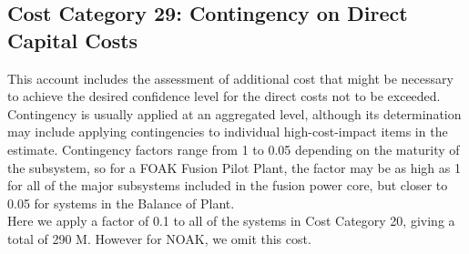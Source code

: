 \subsection{Cost Category 29: Contingency on Direct Capital Costs}

This account includes the assessment of additional cost that might be necessary to achieve the desired confidence level for the direct costs not to be exceeded. Contingency is usually applied at an aggregated level, although its determination may include applying contingencies to individual high-cost-impact items in the estimate.  Contingency factors range from 1 to 0.05 depending on the maturity of the subsystem, so for a FOAK Fusion Pilot Plant, the factor may be as high as 1 for all of the major subsystems included in the fusion power core, but closer to 0.05 for systems in the Balance of Plant.  \\

Here we apply a factor of 0.1 to all of the systems in Cost Category 20, giving a total of  290 M. {\color{blue} However for NOAK, we omit this cost.}

